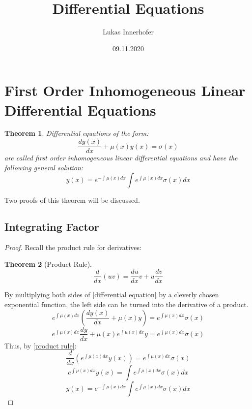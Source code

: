 \documentclass{article}
\title{Differential Equations}
\author{Lukas Innerhofer}
\date{09.11.2020}
\begin{document}
    \maketitle

    \section{First Order Inhomogeneous Linear Differential Equations}
    \newtheorem{theorem}{Theorem}[section]
    \begin{theorem}
        Differential equations of the form:
        \begin{equation} \label{differential equation}
            \frac{dy(x)}{dx}+\mu(x)y(x) = \sigma(x)
        \end{equation}
        are called first order inhomogeneous linear differential equations and 
        have the following general solution:
        \begin{equation} \label{general solution}
            y(x) = e^{-\int \mu(x)dx} \int e^{\int \mu(x)dx} \sigma(x) dx
        \end{equation}
    \end{theorem}
    Two proofs of this theorem will be discussed.

    \subsection{Integrating Factor}
    \begin{proof}
        Recall the product rule for derivatives:
        \begin{theorem}[Product Rule]
            \begin{equation} \label{product rule}
                \frac{d}{dx}(uv)=\frac{du}{dx}v+u\frac{dv}{dx}
            \end{equation}
        \end{theorem}
        By multiplying both sides of \cref{differential equation} by a cleverly chosen
        exponential function, the left side can be turned into the derivative of 
        a product.
        \[ e^{\int \mu(x)dx} (\frac{dy(x)}{dx}+\mu(x)y) = e^{\int \mu(x)dx} \sigma(x) \]
        \[ e^{\int \mu(x)dx}\frac{dy}{dx} + \mu(x)e^{\int \mu(x)dx}y = e^{\int \mu(x)dx} \sigma(x) \]
        Thus, by \cref{product rule}:
        \[ \frac{d}{dx}(e^{\int \mu(x)dx}y(x)) = e^{\int \mu(x)dx} \sigma(x) \]
        \[ e^{\int \mu(x)dx}y(x) = \int e^{\int \mu(x)dx} \sigma(x) dx \]
        \[ y(x) = e^{-\int \mu(x)dx} \int e^{\int \mu(x)dx} \sigma(x) dx \]
    \end{proof}
\end{document}
